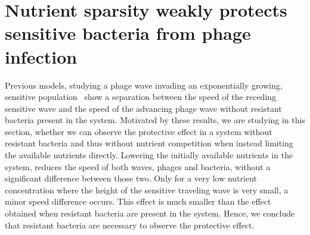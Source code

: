 \section{Nutrient sparsity weakly protects sensitive bacteria from phage infection}
Previous models, studying a phage wave invading an exponentially growing, sensitive population~\cite{Claydon2021-cu} show a separation between the speed of the receding sensitive wave and the speed of the advancing phage wave without resistant bacteria present in the system. Motivated by these results, we are studying in this section, whether we can observe the protective effect in a system without resistant bacteria and thus without nutrient competition when instead limiting the available nutrients directly. Lowering the initially available nutrients in the system, reduces the speed of both waves, phages and bacteria, without a significant difference between those two. Only for a very low nutrient concentration where the height of the sensitive traveling wave is very small, a minor speed difference occurs. This effect is much smaller than the effect obtained when resistant bacteria are present in the system. Hence, we conclude that resistant bacteria are necessary to observe the protective effect.

